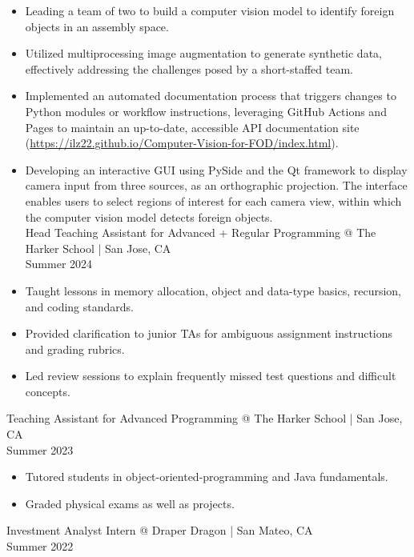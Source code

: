 \documentclass[10pt]{article}
\begin{document}
\begin{itemize}
  \item Leading a team of two to build a computer vision model to identify foreign objects in an assembly space.
  \item Utilized multiprocessing image augmentation to generate synthetic data, effectively addressing the challenges posed by a short-staffed team.
  \item Implemented an automated documentation process that triggers changes to Python modules or workflow instructions, leveraging GitHub Actions and Pages to maintain an up-to-date, accessible API documentation site (\href{https://ilz22.github.io/Computer-Vision-for-FOD/index.html}{https://ilz22.github.io/Computer-Vision-for-FOD/index.html}).
  \item Developing an interactive GUI using PySide and the Qt framework to display camera input from three sources, as an orthographic projection. The interface enables users to select regions of interest for each camera view, within which the computer vision model detects foreign objects.\\
Head Teaching Assistant for Advanced + Regular Programming @ The Harker School | San Jose, CA\\
Summer 2024
  \item Taught lessons in memory allocation, object and data-type basics, recursion, and coding standards.
  \item Provided clarification to junior TAs for ambiguous assignment instructions and grading rubrics.
  \item Led review sessions to explain frequently missed test questions and difficult concepts.
\end{itemize}

Teaching Assistant for Advanced Programming @ The Harker School | San Jose, CA\\
Summer 2023

\begin{itemize}
  \item Tutored students in object-oriented-programming and Java fundamentals.
  \item Graded physical exams as well as projects.
\end{itemize}

Investment Analyst Intern @ Draper Dragon | San Mateo, CA\\
Summer 2022
\end{document}
